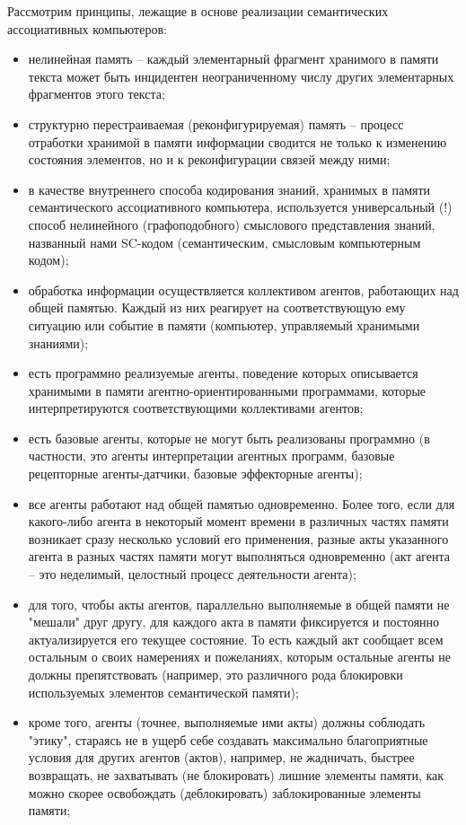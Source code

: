 Рассмотрим принципы, лежащие в основе реализации семантических ассоциативных компьютеров:
\begin{itemize}
	\item нелинейная память -- каждый элементарный фрагмент хранимого в памяти текста может быть инцидентен неограниченному числу других элементарных фрагментов этого текста;
	\item структурно перестраиваемая (реконфигурируемая) память -- процесс отработки хранимой в памяти информации сводится не только к изменению состояния элементов, но и к реконфигурации связей между ними;
	\item в качестве внутреннего способа кодирования знаний, хранимых в памяти семантического ассоциативного компьютера, используется универсальный (!) способ нелинейного (графоподобного) смыслового представления знаний, названный нами SC-кодом (семантическим, смысловым компьютерным кодом);
	\item обработка информации осуществляется коллективом агентов, работающих над общей памятью. Каждый из них реагирует на соответствующую ему ситуацию или событие в памяти (компьютер, управляемый хранимыми знаниями);
	\item есть программно реализуемые агенты, поведение которых описывается хранимыми в памяти агентно-ориентированными программами, которые интерпретируются соответствующими коллективами агентов;
	\item есть базовые агенты, которые не могут быть реализованы программно (в частности, это агенты интерпретации агентных программ, базовые рецепторные агенты-датчики, базовые эффекторные агенты);
	\item все агенты работают над общей памятью одновременно. Более того, если для какого-либо агента в некоторый момент времени в различных частях памяти возникает сразу несколько условий его применения, разные акты указанного агента в разных частях памяти могут выполняться одновременно (акт агента -- это неделимый, целостный процесс деятельности агента);
	\item для того, чтобы акты агентов, параллельно выполняемые в общей памяти не "мешали"{} друг другу, для каждого акта в памяти фиксируется и постоянно актуализируется его текущее состояние. То есть каждый акт сообщает всем остальным о своих намерениях и пожеланиях, которым остальные агенты не должны препятствовать (например, это различного рода блокировки используемых элементов семантической памяти);
	\item кроме того, агенты (точнее, выполняемые ими акты) должны соблюдать "этику"{}, стараясь не в ущерб себе создавать максимально благоприятные условия для других агентов (актов), например, не жадничать, быстрее возвращать, не захватывать (не блокировать) лишние элементы памяти, как можно скорее освобождать (деблокировать) заблокированные элементы памяти;

\end{itemize}
